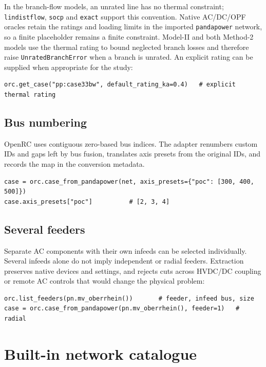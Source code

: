\documentclass[11pt,a4paper]{report}
\newcommand{\code}[1]{\texttt{\small #1}}
\begin{document}
In the branch-flow models, an unrated line has no thermal constraint;
\code{lindistflow}, \code{socp} and \code{exact} support this convention.
Native AC/DC/OPF oracles retain the ratings and loading limits in the imported
\code{pandapower} network, so a finite placeholder remains a finite constraint.
Model-II and both Method-2 models
use the thermal rating to bound neglected branch losses and therefore raise
\code{UnratedBranchError} when a branch is unrated. An explicit rating can be
supplied when appropriate for the study:

\begin{lstlisting}
orc.get_case("pp:case33bw", default_rating_ka=0.4)   # explicit thermal rating
\end{lstlisting}

\subsection{Bus numbering}

OpenRC uses contiguous zero-based bus indices. The adapter renumbers custom
IDs and gaps left by bus fusion, translates axis presets from the original
IDs, and records the map in the conversion metadata.

\begin{lstlisting}
case = orc.case_from_pandapower(net, axis_presets={"poc": [300, 400, 500]})
case.axis_presets["poc"]          # [2, 3, 4]
\end{lstlisting}

\subsection{Several feeders}

Separate AC components with their own infeeds can be selected individually.
Several infeeds alone do not imply independent or radial feeders. Extraction
preserves native devices and settings, and rejects cuts across HVDC/DC coupling
or remote AC controls that would change the physical problem:

\begin{lstlisting}
orc.list_feeders(pn.mv_oberrhein())       # feeder, infeed bus, size
case = orc.case_from_pandapower(pn.mv_oberrhein(), feeder=1)   # radial
\end{lstlisting}

\section{Built-in network catalogue}
\end{document}
